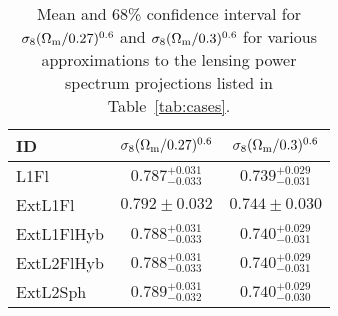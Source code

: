 \renewcommand{\baselinestretch}{1.5}
\begin{table}
\begin{centering}
  
  \caption{\label{tab:CFHTLenS_Sigma8}Mean and 68\% confidence interval for 
  $\sigma_8 (\Omega_{\rm m}/0.27)^{0.6}$ and $\sigma_8 (\Omega_{\rm m}/0.3)^{0.6}$
  for various approximations to the lensing
  power spectrum projections listed in Table~\ref{tab:cases}.}

  \begin{tabular}{lcc} \hline
  ID         & $\sigma_8 (\Omega_{\rm m}/0.27)^{0.6}$ & $\sigma_8 (\Omega_{\rm m}/0.3)^{0.6}$ \\ \hline
  L1Fl       & $0.787^{+0.031}_{-0.033}$ & $0.739^{+0.029}_{-0.031}$ \\
  ExtL1Fl    & $0.792 \pm 0.032$ & $0.744 \pm 0.030$ \\
  ExtL1FlHyb & $0.788^{+0.031}_{-0.033}$ & $0.740^{+0.029}_{-0.031}$ \\
  ExtL2FlHyb & $0.788^{+0.031}_{-0.033}$ & $0.740^{+0.029}_{-0.031}$ \\
  ExtL2Sph   & $0.789^{+0.031}_{-0.032}$ & $0.740^{+0.029}_{-0.030}$ \\ \hline
  \end{tabular}

\end{centering}
\end{table}
\renewcommand{\baselinestretch}{1}


